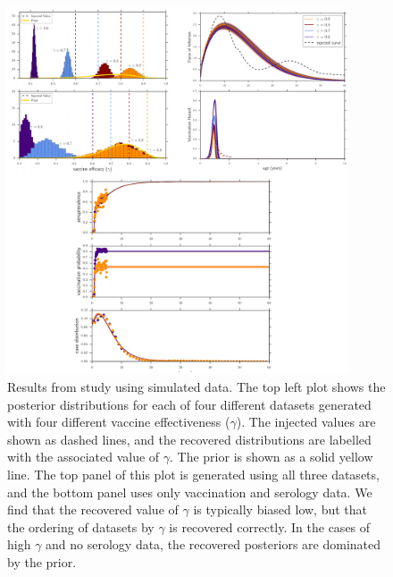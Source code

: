\documentclass[nofootinbib,aps,pre,twocolumn,superscriptaddress,showkeys,showpacs]{revtex4-1}
\begin{document}

\begin{figure}
\includegraphics[width=0.9\textwidth,angle=0]{figures/SimPlots-crop.pdf}
\caption{\label{fig:simplots} Results from study using simulated data. 
The top left plot shows the posterior distributions for each of four different datasets generated with four different vaccine effectiveness ($\gamma$). The injected values are shown as dashed lines, and the recovered distributions are labelled with the associated value of $\gamma$. The prior is shown as a solid yellow line. The top panel of this plot is generated using all three datasets, and the bottom panel uses only vaccination and serology data. We find that the recovered value of $\gamma$ is typically biased low, but that the ordering of datasets by $\gamma$ is recovered correctly. In the cases of high $\gamma$ and no serology data, the recovered posteriors are dominated by the prior.
}
\end{figure}
\end{document}
